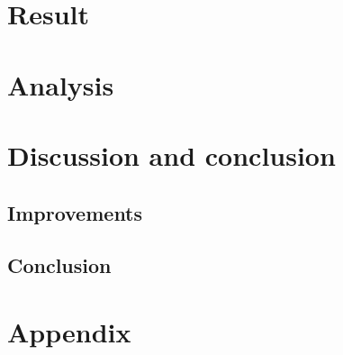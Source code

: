 \section{Result}
%





\section{Analysis}

\section{Discussion and conclusion}


\subsection{Improvements}

\subsection{Conclusion}

\section{Appendix}
